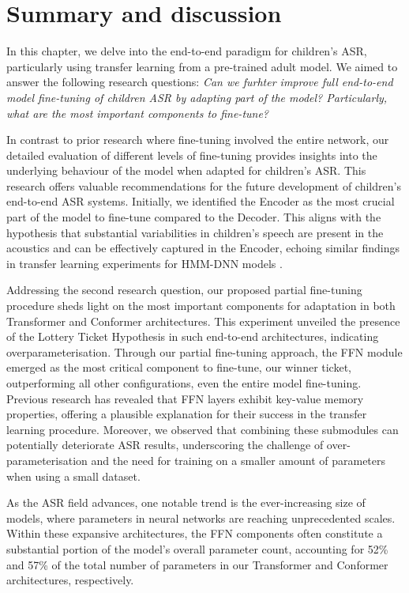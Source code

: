 \section{Summary and discussion}

In this chapter, we delve into the end-to-end paradigm for children's \ac{ASR}, particularly using transfer learning from a pre-trained adult model. We aimed to answer the following research questions: \textit{Can we furhter improve full end-to-end model fine-tuning of children \ac{ASR} by adapting part of the model? Particularly, what are the most important components to fine-tune?}

In contrast to prior research where fine-tuning involved the entire network, our detailed evaluation of different levels of fine-tuning provides insights into the underlying behaviour of the model when adapted for children's \ac{ASR}. This research offers valuable recommendations for the future development of children's end-to-end \ac{ASR} systems. Initially, we identified the Encoder as the most crucial part of the model to fine-tune compared to the Decoder. This aligns with the hypothesis that substantial variabilities in children's speech are present in the acoustics and can be effectively captured in the Encoder, echoing similar findings in transfer learning experiments for \ac{HMM-DNN} models \cite{TFchildren}.

Addressing the second research question, our proposed partial fine-tuning procedure sheds light on the most important components for adaptation in both Transformer and Conformer architectures. This experiment unveiled the presence of the Lottery Ticket Hypothesis in such end-to-end architectures, indicating overparameterisation. Through our partial fine-tuning approach, the \ac{FFN} module emerged as the most critical component to fine-tune, our winner ticket, outperforming all other configurations, even the entire model fine-tuning. Previous research \cite{geva2020transformer} has revealed that \ac{FFN} layers exhibit key-value memory properties, offering a plausible explanation for their success in the transfer learning procedure. Moreover, we observed that combining these submodules can potentially deteriorate \ac{ASR} results, underscoring the challenge of over-parameterisation and the need for training on a smaller amount of parameters when using a small dataset. 

As the \ac{ASR} field advances, one notable trend is the ever-increasing size of models, where parameters in neural networks are reaching unprecedented scales. 
Within these expansive architectures, the \ac{FFN} components often constitute a substantial portion of the model's overall parameter count, accounting for 52\% and 57\% of the total number of parameters in our Transformer and Conformer architectures, respectively.

